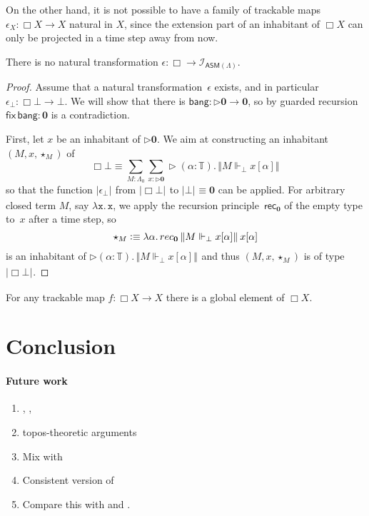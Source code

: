 \documentclass[a4paper,UKenglish,numberwithinsect,cleveref,thm-restate]{lipics-v2021}
\newcommand{\trunc}[2]{\mathopen{}\left\Vert #2\right\Vert_{#1}\mathclose{}}
\newcommand{\tproj}[3][]{\mathopen{}\left|#3\right|_{#2}^{#1}\mathclose{}}
\newcommand{\brck}[1]{\trunc{}{#1}}
\newcommand{\bproj}[1]{\tproj{}{#1}}
\newcommand{\ASM}{\mathsf{ASM}}
\newcommand{\defeq}{\vcentcolon\equiv}
\newcommand{\Empty}{\mathbf{0}}
\theoremstyle{plain}
\begin{document}
On the other hand, it is not possible to have a family of trackable maps $\epsilon_X \colon \Box X \to X$ natural in $X$, since the extension part of an inhabitant of $\Box X$ can only be projected in a time step away from now.
\begin{theorem}\label{thm:GL-no-eval}
  There is no natural transformation $\epsilon\colon \Box \to \mathcal{I}_{\ASM(\Lambda)}$.
\end{theorem}
\begin{proof}
  Assume that a natural transformation~$\epsilon$ exists, and in particular $\epsilon_\bot \colon \Box \bot \to \bot$. 
  We will show that there is $\mathsf{bang}\colon \rhd \Empty \to \Empty$, so by guarded recursion $\mathsf{fix}\,\mathsf{bang} : \Empty$ is a contradiction.
  
  First, let $x$ be an inhabitant of $\rhd \Empty$. We aim at constructing an inhabitant $(M, x, \star_M)$ of
  \[
    \Box \bot \equiv \sum_{M : \Lambda_0} \sum_{x : {\rhd \Empty}} \rhd (\alpha : \mathbb{T}) .\, \brck{M \Vdash_\bot x [\alpha]}
  \]
  so that the function $\bproj{\epsilon_\bot}$ from $\bproj{\Box \bot}$ to $\bproj{\bot} \equiv \Empty$ can be applied.
  For arbitrary closed term $M$, say $\mathtt{\lambda x.\, x}$, we apply the recursion principle~$\mathsf{rec}_{\Empty}$ of the empty type to~$x$ after a time step, so 
  \[
    \star_M \defeq \lambda \alpha.\, \mathsf{rec}_{\Empty}\,\brck{M \Vdash_\bot x[\alpha]}\,x[\alpha]
  \]
  is an inhabitant of $\rhd (\alpha : \mathbb{T}) .\, \brck{M \Vdash_\bot x [\alpha]}$ and thus $(M, x, \star_M)$ is of type $\bproj{\Box \bot}$. 
\end{proof}
\begin{theorem}\label{thm:GL-recursion}
  For any trackable map $f\colon \Box X \to X$ there is a global element of $\Box X$.
\end{theorem}


\section{Conclusion}\label{sec:conclusion}
\paragraph*{Future work}
\begin{enumerate}
  \item {}, \cite{Davies2001b}, \cite{Kavvos2020}
  \item topos-theoretic arguments
  \item Mix with \cite{Kavvos2017b}
  \item Consistent version of \cite{Kavvos2017b}
  \item Compare this with \cite{Shamkanov2014} and \cite{Shamkanov2016a}.
\end{enumerate}
\cite{Davies2001b}
\end{document}
